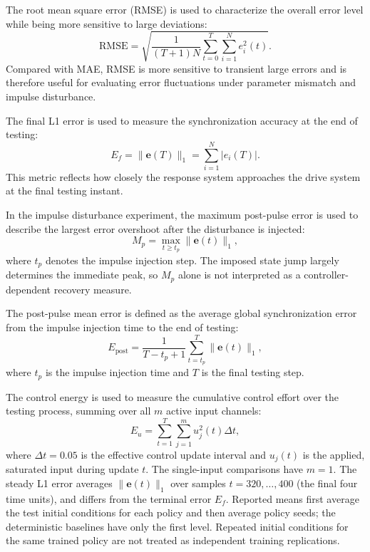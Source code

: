 \documentclass[a4paper,fleqn]{cas-dc}
\theoremstyle{plain}
\theoremstyle{definition}
\begin{document}
The root mean square error (RMSE) is used to characterize the overall error level while being more sensitive to large deviations:
\begin{equation}
	\mathrm{RMSE}
	=
	\sqrt{
		\frac{1}{(T+1)N}
		\sum_{t=0}^{T}
		\sum_{i=1}^{N}
		e_i^2(t)
	}.
	\label{eq:rmse}
\end{equation}
Compared with MAE, RMSE is more sensitive to transient large errors and is therefore useful for evaluating error fluctuations under parameter mismatch and impulse disturbance.

The final L1 error is used to measure the synchronization accuracy at the end of testing:
\begin{equation}
	E_f=\|\mathbf{e}(T)\|_1
	=
	\sum_{i=1}^{N}|e_i(T)|.
	\label{eq:final_l1_error}
\end{equation}
This metric reflects how closely the response system approaches the drive system at the final testing instant.

In the impulse disturbance experiment, the maximum post-pulse error is used to describe the largest error overshoot after the disturbance is injected:
\begin{equation}
	M_p=\max_{t\geq t_p}\|\mathbf{e}(t)\|_1,
	\label{eq:max_post_pulse_error}
\end{equation}
where $t_p$ denotes the impulse injection step. The imposed state jump largely determines the immediate peak, so $M_p$ alone is not interpreted as a controller-dependent recovery measure.

The post-pulse mean error is defined as the average global synchronization error from the impulse injection time to the end of testing:
\begin{equation}
	E_{\mathrm{post}}
	=
	\frac{1}{T-t_p+1}
	\sum_{t=t_p}^{T}
	\|\mathbf{e}(t)\|_1,
	\label{eq:post_pulse_mean_error}
\end{equation}
where $t_p$ is the impulse injection time and $T$ is the final testing step.

The control energy is used to measure the cumulative control effort over the testing process, summing over all $m$ active input channels:
\begin{equation}
	E_u=
	\sum_{t=1}^{T}
	\sum_{j=1}^{m}u_j^2(t)\Delta t,
	\label{eq:control_energy}
\end{equation}
where $\Delta t=0.05$ is the effective control update interval and $u_j(t)$ is the applied, saturated input during update $t$. The single-input comparisons have $m=1$. The steady L1 error averages $\|\mathbf e(t)\|_1$ over samples $t=320,\ldots,400$ (the final four time units), and differs from the terminal error $E_f$. Reported means first average the test initial conditions for each policy and then average policy seeds; the deterministic baselines have only the first level. Repeated initial conditions for the same trained policy are not treated as independent training replications.
\end{document}
